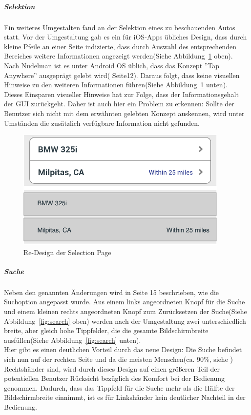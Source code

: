 \subparagraph{Selektion}
\label{sub:selection}
Ein weiteres Umgestalten fand an der Selektion eines zu beschauenden Autos statt. Vor der Umgestaltung gab es ein für iOS-Apps übliches Design, dass durch kleine Pfeile an einer Seite indizierte, dass durch Auswahl des entsprechenden Bereiches weitere Informationen angezeigt werden(Siehe Abbildung~\ref{fig:selection} oben). Nach Nudelman ist es unter Android OS üblich, dass das Konzept ''Tap Anywhere'' ausgeprägt gelebt wird(\cite{AndroidDesignPatterns} Seite12). Daraus folgt, dass keine visuellen Hinweise zu den weiteren Informationen führen(Siehe Abbildung~\ref{fig:selection} unten).\\

Dieses Einsparen visueller Hinweise hat zur Folge, dass der Informationsgehalt der GUI zurückgeht. Daher ist auch hier ein Problem zu erkennen: Sollte der Benutzer sich nicht mit dem erwähnten gelebten Konzept auskennen, wird unter Umständen die zusätzlich verfügbare Information nicht gefunden.\\
\begin{figure}[h]
 \centering
 \includegraphics[height=0.08\textheight]{img/rows.png}
 \caption{Re-Design der Selection Page}
 \label{fig:selection}
\end{figure}

\subparagraph{Suche}
\label{sub:search}
Neben den genannten Änderungen wird in \cite{AndroidDesignPatterns} Seite 15 beschrieben, wie die Suchoption angepasst wurde. Aus einem links angeordneten Knopf für die Suche und einem kleinen rechts angeordneten Knopf zum Zurücksetzen der Suche(Siehe Abbildung~\ref{fig:search} oben) werden nach der Umgestaltung zwei unterschiedlich breite, aber gleich hohe Tippfelder, die die gesamte Bildschirmbreite ausfüllen(Siehe Abbildung~\ref{fig:search} unten).\\

Hier gibt es einen deutlichen Vorteil durch das neue Design: Die Suche befindet sich nun auf der rechten Seite und da die meisten Menschen(ca. 90\%, siehe \cite{Handedness}) Rechtshänder sind, wird durch dieses Design auf einen größeren Teil der potentiellen Benutzer Rücksicht bezüglich des Komfort bei der Bedienung genommen. Dadurch, dass das Tippfeld für die Suche mehr als die Hälfte der Bildschirmbreite einnimmt, ist es für Linkshänder kein deutlicher Nachteil in der Bedienung.

